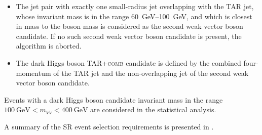 \begin{enumerate}
\begin{itemize}
    \item The jet pair with exactly one small-radius jet overlapping with the TAR jet, whose invariant mass is in the range \SIrange{60}{100}{\giga\electronvolt}, and which is closest in mass to the \PW boson mass is considered as the second weak vector boson candidate. If no such second weak vector boson candidate is present, the algorithm is aborted.
    \item The dark Higgs boson \textsc{TAR+comb} candidate is defined by the combined four-momentum of the TAR jet and the non-overlapping jet of the second weak vector boson candidate.
  \end{itemize}
\end{enumerate}

Events with a dark Higgs boson candidate invariant mass in the range \(\SI{100}{\giga\electronvolt} < m_{VV} < \SI{400}{\giga\electronvolt}\) are considered in the statistical analysis.

A summary of the SR event selection requirements is presented in .
\begin{table}[hbtp]
\caption{List of the SR event selection requirements employed in the \(\met + \sVV\) search.}
\label{tab:monoSVV:selection:sr:overview}
\centering
{}
\end{table}


